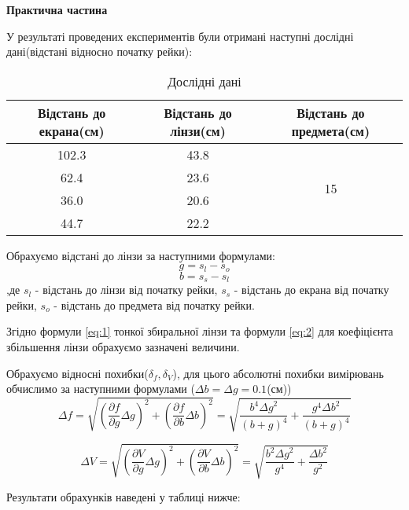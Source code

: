 \begin{center}
    \Large{\textbf{Практична частина}}
\end{center}

\vspace{1mm}

У результаті проведених експериментів 
були отримані наступні дослідні дані(відстані відносно початку рейки):
\begin{table}[h] \label{table:raw}
    \centering
    \begin{tabular}{ |c|c|c| }
        \hline 
        \textbf{Відстань до екрана(см)} & \textbf{Відстань до лінзи(см)} & \textbf{Відстань до предмета(см)} \\
        \hline
        102.3 & 43.8 & \multirow{4}{*}{15} \\
        \cline{1-2}
        62.4 & 23.6 & \\
        \cline{1-2}
        36.0 & 20.6 & \\
        \cline{1-2}
        44.7 & 22.2 & \\
        \hline
    \end{tabular}
    \caption{Дослідні дані}
\end{table}


Обрахуємо відстані до лінзи за наступними формулами:
$$ g = s_l - s_o $$
$$ b = s_s - s_l $$
,де $s_l$ - відстань до лінзи від початку рейки,
$s_s$ - відстань до екрана від початку рейки,
$s_o$ - відстань до предмета від початку рейки.

Згідно формули \ref{eq:1} тонкої збиральної лінзи 
та формули \ref{eq:2} для коефіцієнта збільшення лінзи обрахуємо
зазначені величини. 

Обрахуємо відносні похибки($\delta_f, \delta_V$), для цього абсолютні похибки вимірювань обчислимо за наступними формулами ($\Delta b = \Delta g = 0.1$(см))
$$ \Delta f = \sqrt{ \left( \frac{\partial{f}}{ \partial{g} } \Delta g \right)^2 +
\left( \frac{\partial{f}}{ \partial{b} } \Delta b \right)^2 } = 
\sqrt{ \frac{b^4 {\Delta g}^2}{ (b+g)^4 } + \frac{g^4 {\Delta b}^2}{ (b+g)^4 } } $$

$$ \Delta V = \sqrt{ \left( \frac{\partial{V}}{ \partial{g} } \Delta g \right)^2 +
\left( \frac{\partial{V}}{ \partial{b} } \Delta b \right)^2 } =
\sqrt{ \frac{b^2 {\Delta g}^2}{ g^4 } + \frac{{\Delta b}^2}{ g^2 } } $$

Результати обрахунків наведені у таблиці нижче:

